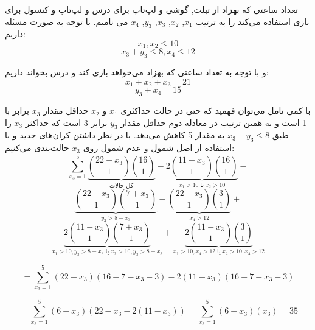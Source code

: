 	تعداد ساعتی که بهزاد از تبلت, گوشی و لپ‌تاپ برای درس و لپ‌تاپ و کنسول برای بازی استفاده می‌کند را به ترتیب $x_1$, $x_2$, $x_3$, $y_3$, $x_4$ می نامیم.
    با توجه به صورت مسئله داریم:
    $$x_1, x_2 \leq 10$$
    $$x_3 + y_3 \leq 8 , x_4 \leq 12$$
    
    و با توجه به تعداد ساعتی که بهزاد می‌خواهد بازی کند و درس بخواند داریم:
    $$x_1 + x_2 + x_3 = 21$$
    $$y_3 + x_4 = 15$$
    
    با کمی تامل می‌توان فهمید که حتی در حالت حداکثری $x_1$ و $x_2$ حداقل مقدار $x_3$ برابر با 1 است و به همین ترتیب در معادله دوم حداقل مقدار $y_3$ برابر 3 است که حداکثر $x_3$ را طبق $x_3 + y_3 \leq 8$ به مقدار 5 کاهش می‌دهد. با در نظر داشتن کران‌های جدید و با استفاده از اصل شمول و عدم شمول روی $x_3$ حالت‌بندی می‌کنیم:
    $$\sum\limits_{x_3 = 1}^5 \underbrace{{22 - x_3 \choose 1}{16 \choose 1}}_{\text{کل حالات}} - \underbrace{2{11 - x_3 \choose 1}{16 \choose 1}}_{x_1 > 10 \; \text{یا} \; x_2 > 10} - $$
    $$\underbrace{{22 - x_3 \choose 1}{7 + x_3 \choose 1}}_{y_3 > 8 - x_3} - \underbrace{{22 - x_3 \choose 1}{3 \choose 1}}_{x_4 > 12} + $$
    $$\underbrace{2{11 - x_3 \choose 1}{7 + x_3 \choose 1}}_{x_1 > 10, y_3 > 8 - x_3 \; \text{یا} \; x_2 > 10, y_3 > 8 - x_3} + \underbrace{2{11 - x_3 \choose 1}{3 \choose 1}}_{x_1 > 10, x_4 > 12 \; \text{یا} \; x_2 > 10, x_4 > 12}$$
    
    $$= \sum\limits_{x_3 = 1}^5 (22 - x_3)(16 - 7 - x_3 - 3) - 2(11 - x_3)(16 - 7 - x_3 - 3)$$
    
    $$= \sum\limits_{x_3 = 1}^5 (6 - x_3)(22 - x_3 - 2(11 - x_3)) = \sum\limits_{x_3 = 1}^5 (6 - x_3)(x_3) = 35$$
